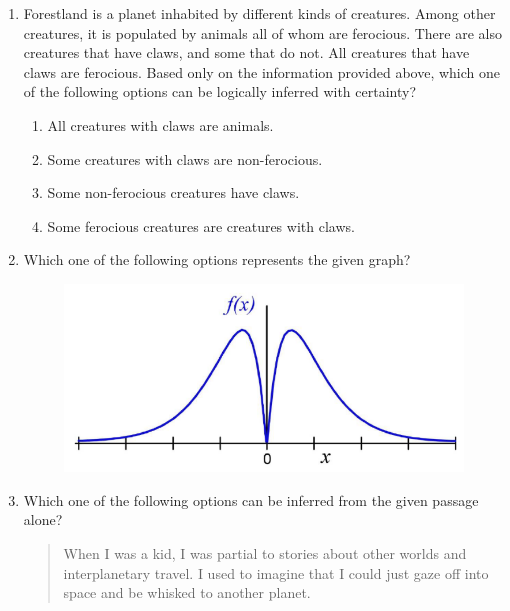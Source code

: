 \documentclass[a4paper, 11pt]{article}
\begin{document}
\begin{enumerate}
    \hfill{}
    
    \item Forestland is a planet inhabited by different kinds of creatures. Among other creatures, it is populated by animals all of whom are ferocious. There are also creatures that have claws, and some that do not. All creatures that have claws are ferocious.
    Based only on the information provided above, which one of the following options can be logically inferred with certainty?
    
    \begin{enumerate}
        \item All creatures with claws are animals.
        \item Some creatures with claws are non-ferocious.
        \item Some non-ferocious creatures have claws.
        \item Some ferocious creatures are creatures with claws.
    \end{enumerate}
    
    \hfill{}
    
    \item Which one of the following options represents the given graph?
    \begin{figure}[H]
        \centering
        \includegraphics[width=0.4\columnwidth]{figs/GA7.png}
        \caption*{}
        \label{fig:q7}
    \end{figure}
    
    \begin{enumerate}
    \end{enumerate}
    
    \hfill{}

    \item Which one of the following options can be inferred from the given passage alone?
    \begin{quote}
    When I was a kid, I was partial to stories about other worlds and interplanetary travel. I used to imagine that I could just gaze off into space and be whisked to another planet.
    \end{quote}


\end{enumerate}
\end{document}
